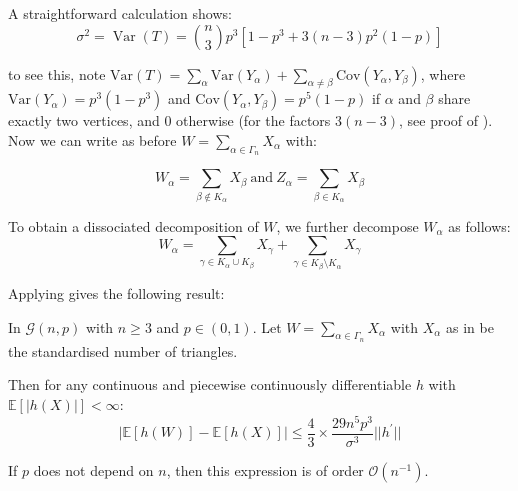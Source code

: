 \documentclass{article}
\begin{document}
A straightforward calculation shows:
\[
    \sigma^{2}=\operatorname{Var}(T)={\binom{n}{3}}p^{3}[1-p^{3}+3(n-3)p^{2}(1-p)]
\]

to see this, note $\mathrm{Var}(T) = \sum_\alpha \mathrm{Var}(Y_\alpha) + \sum_{\alpha\neq \beta} \mathrm{Cov}(Y_\alpha, Y_\beta)$, where $\mathrm{Var}(Y_\alpha) = p^3(1-p^3)$ and $\mathrm{Cov}(Y_\alpha, Y_\beta) = p^5(1-p)$ if $\alpha$ and $\beta$ share exactly two vertices, and 0 otherwise (for the factors $3(n-3)$, see proof of ). Now we can write as before $W = \sum_{\alpha \in \Gamma_n} X_\alpha$ with:

\[
    W_{\alpha}=\sum_{\beta\notin K_{\alpha}}X_{\beta}{\mathrm{~and~}}Z_{\alpha}=\sum_{\beta\in K_{\alpha}}X_{\beta}
\]

To obtain a dissociated decomposition of $W$, we further decompose $W_\alpha$ as follows:
\[
    W_{\alpha}=\sum_{\gamma\in K_{\alpha}\cup K_{\beta}}X_{\gamma}+\sum_{\gamma\in K_{\beta}\setminus K_{\alpha}}X_{\gamma}
\]

Applying  gives the following result:

\begin{theorem}\label{thm:triangle_gnp_normal}
    In $\mathcal{G}(n,p)$ with $n\geq 3$ and $p\in (0,1)$. Let $W = \sum_{\alpha \in \Gamma_n} X_\alpha$  with $X_\alpha$ as in  be the standardised number of triangles.  
    
    Then for any continuous and piecewise continuously differentiable $h$ with $\mathbb{E}[|h(X)|]<\infty$: 
    \[
        |\mathbb{E} [h(W)]- \mathbb{E}[h(X)]| \leq \frac{4}{3}\times\frac{29n^{5}p^{3}}{\sigma^{3}}||h^{\prime}||
    \]

    If $p$ does not depend on $n$, then this expression is of order $\mathcal{O}(n^{-1})$.
\end{theorem}
\end{document}

